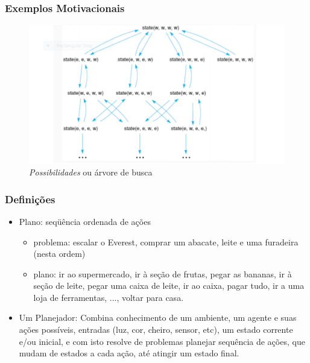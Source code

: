 \begin{frame}[fragile]
	
	\frametitle{Exemplos Motivacionais}
	
	\begin{figure}[!htb]
		\centering
		\includegraphics[width=.7\textwidth, height=0.640\textheight]{figures/search-tree-sheper.pdf}
		\caption{\textit{Possibilidades} ou \'arvore de busca}
	\end{figure}
	
\end{frame}


\begin{frame}[fragile]

  \frametitle{Definições}

   \begin{block}{}
     \begin{itemize}
      \item Plano: seqüência ordenada de ações
       \pause
         \begin{itemize}
           \item problema: escalar o Everest, comprar um abacate, leite e uma furadeira (nesta ordem)

           \pause
            \item plano: ir ao supermercado, ir à seção de frutas, pegar as bananas, 
            ir à seção de leite, pegar uma caixa de leite, ir ao caixa,  pagar tudo, 
            ir a uma loja de ferramentas, ..., voltar para casa.
                                
         \end{itemize}

       \pause
       \item Um Planejador:
        Combina conhecimento de um ambiente, um agente e suas ações possíveis,
        entradas (luz, cor, cheiro, sensor, etc), um estado corrente
        e/ou inicial, e com isto resolve de problemas planejar sequência
        de ações, que mudam de estados a cada ação, até atingir um 
        estado final.
       
    \end{itemize}
    
    \end{block}
    
\end{frame}



